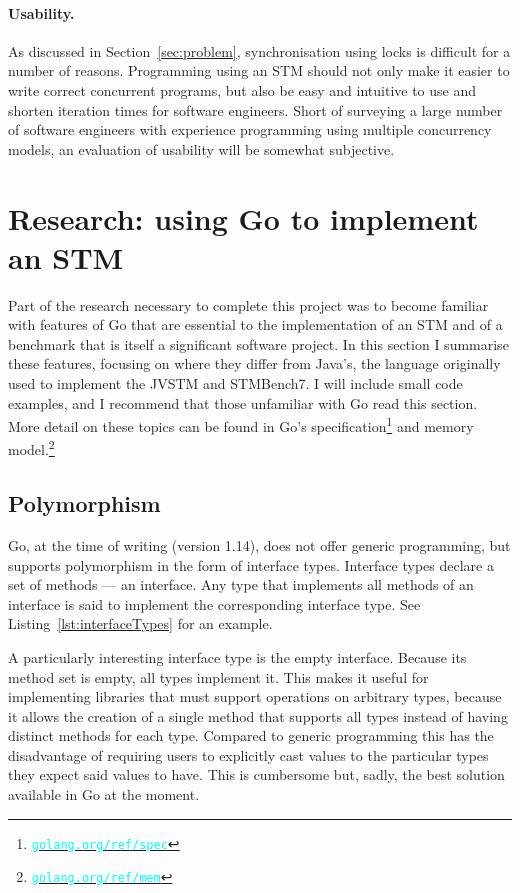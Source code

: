 \documentclass[12pt,a4paper,oneside,openright]{report}
\newcommand{\URL}[1]{\href{https://#1}{\textcolor{cyan}{\texttt{#1}}}}
\begin{document}
\paragraph{Usability.} As discussed in Section~\ref{sec:problem},
synchronisation using locks is difficult for a number of
reasons. Programming using an STM should not only make it easier to
write correct concurrent programs, but also be easy and intuitive to
use and shorten iteration times for software engineers. Short of
surveying a large number of software engineers with experience
programming using multiple concurrency models, an evaluation of
usability will be somewhat subjective.

\section{Research: using Go to implement an STM}
\label{sec:prep:research}

Part of the research necessary to complete this project was to become
familiar with features of Go that are essential to the implementation
of an STM and of a benchmark that is itself a significant software
project. In this section I summarise these features, focusing on where
they differ from Java's, the language originally used to implement the
JVSTM and STMBench7. I will include small code examples, and I
recommend that those unfamiliar with Go read this section. More detail
on these topics can be found in Go's
specification\footnote{\URL{golang.org/ref/spec}} and memory
model.\footnote{\URL{golang.org/ref/mem}}

\subsection{Polymorphism}
\label{sec:prep:polymorphism}

Go, at the time of writing (version 1.14), does not offer generic
programming, but supports polymorphism in the form of interface
types. Interface types declare a set of methods --- an interface. Any
type that implements all methods of an interface is said to implement
the corresponding interface type. See Listing~\ref{lst:interfaceTypes}
for an example.

A particularly interesting interface type is the empty
interface. Because its method set is empty, all types implement
it. This makes it useful for implementing libraries that must support
operations on arbitrary types, because it allows the creation of a
single method that supports all types instead of having distinct
methods for each type. Compared to generic programming this has the
disadvantage of requiring users to explicitly cast values to the
particular types they expect said values to have. This is cumbersome
but, sadly, the best solution available in Go at the moment.
\end{document}
